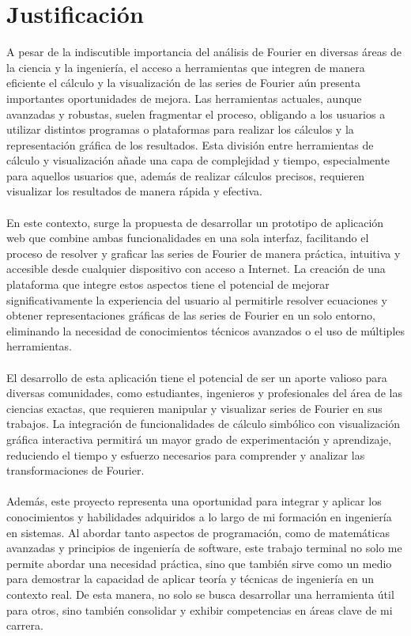 \section{Justificación}
A pesar de la indiscutible importancia del análisis de Fourier en diversas áreas de la ciencia y la ingeniería, el acceso a herramientas que integren de manera eficiente el cálculo y la visualización de las series de Fourier aún presenta importantes oportunidades de mejora. Las herramientas actuales, aunque avanzadas y robustas, suelen fragmentar el proceso, obligando a los usuarios a utilizar distintos programas o plataformas para realizar los cálculos y la representación gráfica de los resultados. Esta división entre herramientas de cálculo y visualización añade una capa de complejidad y tiempo, especialmente para aquellos usuarios que, además de realizar cálculos precisos, requieren visualizar los resultados de manera rápida y efectiva.\\\\
En este contexto, surge la propuesta de desarrollar un prototipo de aplicación web que combine ambas funcionalidades en una sola interfaz, facilitando el proceso de resolver y graficar las series de Fourier de manera práctica, intuitiva y accesible desde cualquier dispositivo con acceso a Internet. La creación de una plataforma que integre estos aspectos tiene el potencial de mejorar significativamente la experiencia del usuario al permitirle resolver ecuaciones y obtener representaciones gráficas de las series de Fourier en un solo entorno, eliminando la necesidad de conocimientos técnicos avanzados o el uso de múltiples herramientas. \\\\
El desarrollo de esta aplicación tiene el potencial de ser un aporte valioso para diversas comunidades, como estudiantes, ingenieros y profesionales del área de las ciencias exactas, que requieren manipular y visualizar series de Fourier en sus trabajos. La integración de funcionalidades de cálculo simbólico con visualización gráfica interactiva permitirá un mayor grado de experimentación y aprendizaje, reduciendo el tiempo y esfuerzo necesarios para comprender y analizar las transformaciones de Fourier. \\\\
Además, este proyecto representa una oportunidad para integrar y aplicar los conocimientos y habilidades adquiridos a lo largo de mi formación en ingeniería en sistemas. Al abordar tanto aspectos de programación, como de matemáticas avanzadas y principios de ingeniería de software, este trabajo terminal no solo me permite abordar una necesidad práctica, sino que también sirve como un medio para demostrar la capacidad de aplicar teoría y técnicas de ingeniería en un contexto real. De esta manera, no solo se busca desarrollar una herramienta útil para otros, sino también consolidar y exhibir competencias en áreas clave de mi carrera.


